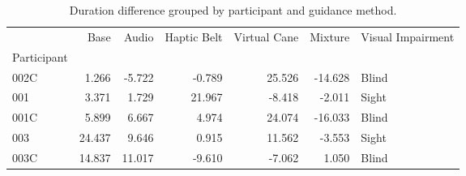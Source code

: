 
\begin{table}[!htb]
\centering
\caption{Duration difference grouped by participant and guidance method.}
\label{tab:duracao_var}
\begin{tabular}{lrrrrrl}
\toprule
{} &   Base &  Audio &  Haptic Belt &  Virtual Cane &  Mixture & Visual Impairment \\
Participant &        &        &              &               &          &                   \\
\midrule
002C        &  1.266 & -5.722 &       -0.789 &        25.526 &  -14.628 &             Blind \\
001         &  3.371 &  1.729 &       21.967 &        -8.418 &   -2.011 &             Sight \\
001C        &  5.899 &  6.667 &        4.974 &        24.074 &  -16.033 &             Blind \\
003         & 24.437 &  9.646 &        0.915 &        11.562 &   -3.553 &             Sight \\
003C        & 14.837 & 11.017 &       -9.610 &        -7.062 &    1.050 &             Blind \\
\bottomrule
\end{tabular}
\end{table}

